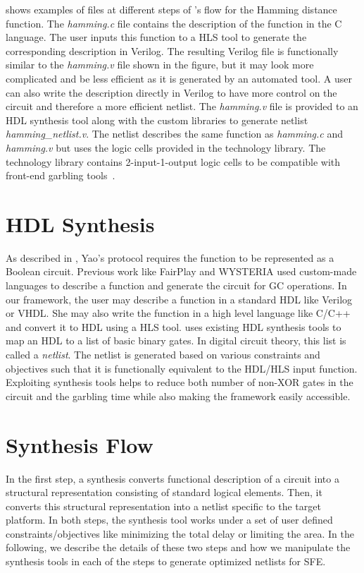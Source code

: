  shows examples of files at different steps of \sys{}'s flow for the Hamming distance function.
The \textsl{hamming.c} file contains the description of the function in the C language.
The user inputs this function to a HLS tool to generate the corresponding description in Verilog.
The resulting Verilog file is functionally similar to the \textsl{hamming.v} file shown in the figure, but it may look more complicated and be less efficient as it is generated by an automated tool.
A user can also write the description directly in Verilog to have more control on the circuit and therefore a more efficient netlist.
The \textsl{hamming.v} file is provided to an HDL synthesis tool along with the \sys{} custom libraries to generate netlist \textsl{hamming\_netlist.v}.
The netlist describes the same function as \textsl{hamming.c} and \textsl{hamming.v} but uses the logic cells provided in the technology library.
The technology library contains 2-input-1-output logic cells to be compatible with front-end garbling tools~\cite{malkhi2004fairplay, bellare2013efficient}.

\section{HDL Synthesis}
As described in , Yao's protocol requires the function to be represented as a Boolean circuit.
Previous work like FairPlay \cite{malkhi2004fairplay} and WYSTERIA \cite{rastogi2014wysteria} used custom-made languages to describe a function and generate the circuit for GC operations.
In our \sys{} framework, the user may describe a function in a standard HDL like Verilog or VHDL.
She may also write the function in a high level language like C/C++ and convert it to HDL using a HLS tool.
\sys{} uses existing HDL synthesis tools to map an HDL to a list of basic binary gates.
In digital circuit theory, this list is called a \emph{netlist}.
The netlist is generated based on various constraints and objectives such that it is functionally equivalent to the HDL/HLS input function.
Exploiting synthesis tools helps to reduce both number of non-XOR gates in the circuit and the garbling time while also making the framework easily accessible.

\section{Synthesis Flow}
In the first step, a synthesis converts functional description of a circuit into a structural representation consisting of standard logical elements.
Then, it converts this structural representation into a netlist specific to the target platform.
In both steps, the synthesis tool works under a set of user defined constraints/objectives like minimizing the total delay or limiting the area.
In the following, we describe the details of these two steps and how we manipulate the synthesis tools in each of the steps to generate optimized netlists for SFE.

